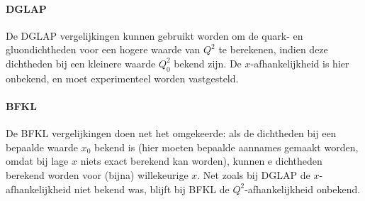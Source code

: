 \documentclass[a4paper,11pt]{article}
\numberwithin{equation}{section} %
\begin{document}
      \paragraph{DGLAP}
De DGLAP vergelijkingen kunnen gebruikt worden om de quark- en gluondichtheden voor een hogere waarde van $Q^2$ te berekenen, indien deze dichtheden bij een kleinere waarde $Q_0^2$ bekend zijn.
De $x$-afhankelijkheid is hier onbekend, en moet experimenteel worden vastgesteld.

      \paragraph{BFKL}
De BFKL vergelijkingen doen net het omgekeerde: als de dichtheden bij een bepaalde waarde $x_0$ bekend is (hier moeten bepaalde aannames gemaakt worden, omdat bij lage $x$ niets exact berekend kan worden), kunnen e dichtheden berekend worden voor (bijna) willekeurige $x$.
Net zoals bij DGLAP de $x$-afhankelijkheid niet bekend was, blijft bij BFKL de $Q^2$-afhankelijkheid onbekend.
\end{document}

